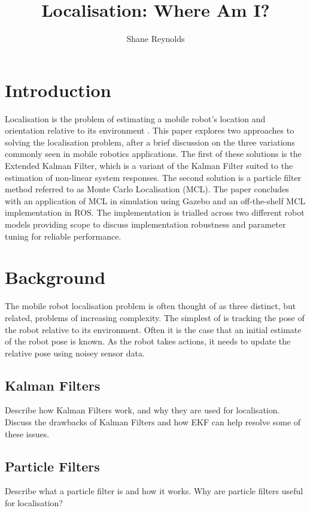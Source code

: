 \documentclass[a4paper]{article}
\begin{document}
\title{Localisation: Where Am I?}
\author{Shane Reynolds}
\maketitle
\tableofcontents
\newpage
\section{Introduction}
Localisation is the problem of estimating a mobile robot's location and orientation relative to its environment \cite{Thrun:2001}. This paper explores two approaches to solving the localisation problem, after a brief discussion on the three variations commonly seen in mobile robotics applications. The first of these solutions is the Extended Kalman Filter, which is a variant of the Kalman Filter suited to the estimation of non-linear system responses. The second solution is a particle filter method referred to as Monte Carlo Localisation (MCL). The paper concludes with an application of MCL in simulation using Gazebo and an off-the-shelf MCL implementation in ROS. The implementation is trialled across two different robot models providing scope to discuss implementation robustness and parameter tuning for reliable performance.

\section{Background}
The mobile robot localisation problem is often thought of as three distinct, but related, problems of increasing complexity. The simplest of is tracking the pose of the robot relative to its environment. Often it is the case that an initial estimate of the robot pose is known. As the robot takes actions, it needs to update the relative pose using noisey sensor data.

\subsection{Kalman Filters}
Describe how Kalman Filters work, and why they are used for localisation. Discuss the drawbacks of Kalman Filters and how EKF can help resolve some of these issues.

\subsection{Particle Filters}
Describe what a particle filter is and how it works. Why are particle filters useful for localisation?
\end{document}
